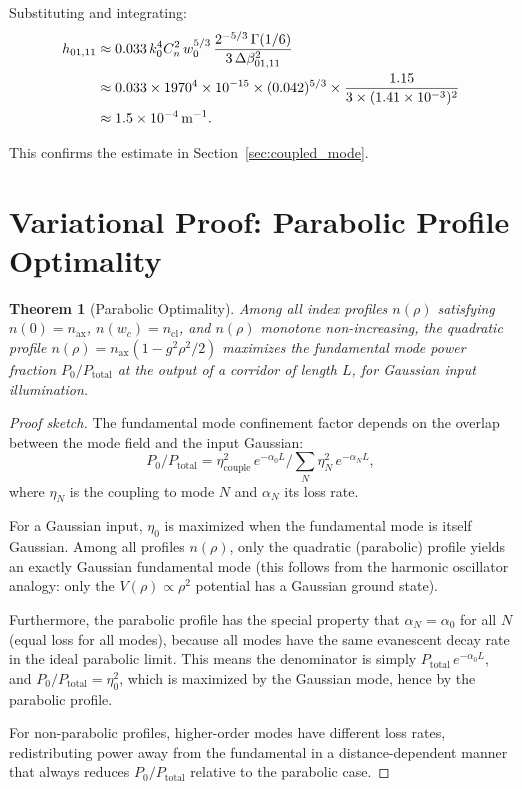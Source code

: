 \documentclass[journal,twocolumn]{IEEEtran}
\newtheorem{theorem}{Theorem}
\begin{document}
Substituting and integrating:
\begin{align}
h_{01,11} &\approx 0.033\,k_0^4 C_n^2\,w_0^{5/3}\,
\frac{2^{-5/3}\,\Gamma(1/6)}{3\,\Delta\beta_{01,11}^2}\\
&\approx 0.033 \times 1970^4 \times 10^{-15} \times (0.042)^{5/3}
\times \frac{1.15}{3\times(1.41\times10^{-3})^2}\notag\\
&\approx 1.5\times10^{-4}\,\text{m}^{-1}.
\end{align}

This confirms the estimate in Section~\ref{sec:coupled_mode}.

\section{Variational Proof: Parabolic Profile Optimality}\label{app:variational}

\begin{theorem}[Parabolic Optimality]
Among all index profiles $n(\rho)$ satisfying
$n(0) = n_\text{ax}$, $n(w_c) = n_\text{cl}$, and $n(\rho)$
monotone non-increasing, the quadratic profile
$n(\rho) = n_\text{ax}(1 - g^2\rho^2/2)$ maximizes the fundamental
mode power fraction $P_0/P_\text{total}$ at the output of a corridor
of length $L$, for Gaussian input illumination.
\end{theorem}

\begin{proof}[Proof sketch]
The fundamental mode confinement factor depends on the overlap between
the mode field and the input Gaussian:
\begin{equation}
P_0/P_\text{total} = \eta_\text{couple}^2\,e^{-\alpha_0 L}
\bigg/ \sum_N \eta_N^2\,e^{-\alpha_N L},
\end{equation}
where $\eta_N$ is the coupling to mode $N$ and $\alpha_N$ its loss rate.

For a Gaussian input, $\eta_0$ is maximized when the fundamental mode
is itself Gaussian. Among all profiles $n(\rho)$, only the quadratic
(parabolic) profile yields an exactly Gaussian fundamental mode
(this follows from the harmonic oscillator analogy: only the
$V(\rho) \propto \rho^2$ potential has a Gaussian ground state).

Furthermore, the parabolic profile has the special property that
$\alpha_N = \alpha_0$ for all $N$ (equal loss for all modes), because
all modes have the same evanescent decay rate in the ideal parabolic
limit. This means the denominator is simply
$P_\text{total}\,e^{-\alpha_0 L}$, and $P_0/P_\text{total} = \eta_0^2$,
which is maximized by the Gaussian mode, hence by the parabolic profile.

For non-parabolic profiles, higher-order modes have different loss rates,
redistributing power away from the fundamental in a distance-dependent
manner that always reduces $P_0/P_\text{total}$ relative to the
parabolic case.
\end{proof}
\end{document}
